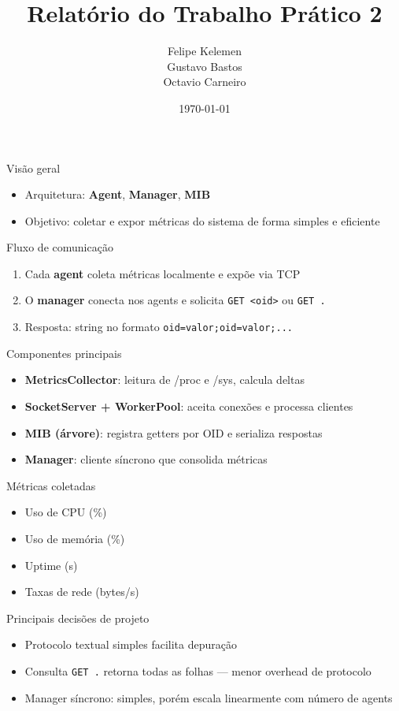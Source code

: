 \documentclass{beamer}
\title{Relatório do Trabalho Prático 2}
\author{Felipe Kelemen \\ Gustavo Bastos \\ Octavio Carneiro}
\date{\today}
\begin{document}
\begin{frame}
  \titlepage
\end{frame}

\begin{frame}{Visão geral}
\begin{itemize}
  \item Arquitetura: \textbf{Agent}, \textbf{Manager}, \textbf{MIB}
  \item Objetivo: coletar e expor métricas do sistema de forma simples e eficiente
\end{itemize}
\end{frame}

\begin{frame}{Fluxo de comunicação}
\begin{enumerate}
  \item Cada \textbf{agent} coleta métricas localmente e expõe via TCP
  \item O \textbf{manager} conecta nos agents e solicita \texttt{GET <oid>} ou \texttt{GET .}
  \item Resposta: string no formato \texttt{oid=valor;oid=valor;...}
\end{enumerate}
\end{frame}

\begin{frame}{Componentes principais}
\begin{itemize}
  \item \textbf{MetricsCollector}: leitura de /proc e /sys, calcula deltas
  \item \textbf{SocketServer + WorkerPool}: aceita conexões e processa clientes
  \item \textbf{MIB (árvore)}: registra getters por OID e serializa respostas
  \item \textbf{Manager}: cliente síncrono que consolida métricas
\end{itemize}
\end{frame}

\begin{frame}{Métricas coletadas}
\begin{itemize}
  \item Uso de CPU (\%)
  \item Uso de memória (\%)
  \item Uptime (s)
  \item Taxas de rede (bytes/s)
\end{itemize}
\end{frame}

\begin{frame}{Principais decisões de projeto}
\begin{itemize}
  \item Protocolo textual simples facilita depuração
  \item Consulta \texttt{GET .} retorna todas as folhas — menor overhead de protocolo
  \item Manager síncrono: simples, porém escala linearmente com número de agents
\end{itemize}
\end{frame}
\end{document}
